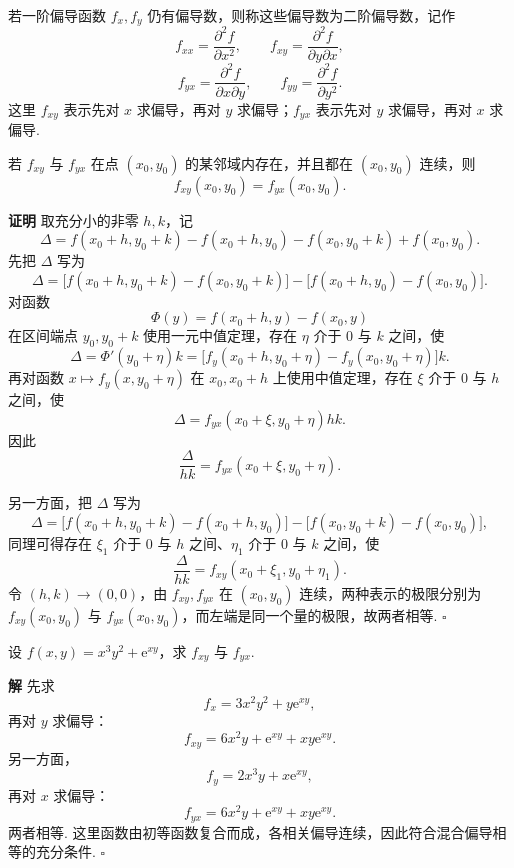 \documentclass[fontset=fandol]{ctexart}
\newenvironment{proofdetail}{\par\noindent\textbf{证明}\quad}{\hfill$\square$\par\vspace{0.8em}}
\newenvironment{solution}{\par\noindent\textbf{解}\quad}{\hfill$\square$\par\vspace{0.8em}}
\newcommand{\ee}{\mathrm{e}}
\begin{document}
\begin{definition}[二阶偏导数]
若一阶偏导函数 $f_x,f_y$ 仍有偏导数，则称这些偏导数为二阶偏导数，记作
\[
f_{xx}=\frac{\partial^2 f}{\partial x^2},\qquad
f_{xy}=\frac{\partial^2 f}{\partial y\partial x},
\]
\[
f_{yx}=\frac{\partial^2 f}{\partial x\partial y},\qquad
f_{yy}=\frac{\partial^2 f}{\partial y^2}.
\]
这里 $f_{xy}$ 表示先对 $x$ 求偏导，再对 $y$ 求偏导；$f_{yx}$ 表示先对 $y$ 求偏导，再对 $x$ 求偏导.
\end{definition}

\begin{theorem}[混合偏导相等的充分条件]
若 $f_{xy}$ 与 $f_{yx}$ 在点 $(x_0,y_0)$ 的某邻域内存在，并且都在 $(x_0,y_0)$ 连续，则
\[
f_{xy}(x_0,y_0)=f_{yx}(x_0,y_0).
\]
\end{theorem}
\begin{proofdetail}
取充分小的非零 $h,k$，记
\[
\Delta=f(x_0+h,y_0+k)-f(x_0+h,y_0)-f(x_0,y_0+k)+f(x_0,y_0).
\]
先把 $\Delta$ 写为
\[
\Delta=\bigl[f(x_0+h,y_0+k)-f(x_0,y_0+k)\bigr]
-\bigl[f(x_0+h,y_0)-f(x_0,y_0)\bigr].
\]
对函数
\[
\Phi(y)=f(x_0+h,y)-f(x_0,y)
\]
在区间端点 $y_0,y_0+k$ 使用一元中值定理，存在 $\eta$ 介于 $0$ 与 $k$ 之间，使
\[
\Delta=\Phi'(y_0+\eta)k
=\bigl[f_y(x_0+h,y_0+\eta)-f_y(x_0,y_0+\eta)\bigr]k.
\]
再对函数 $x\mapsto f_y(x,y_0+\eta)$ 在 $x_0,x_0+h$ 上使用中值定理，存在 $\xi$ 介于 $0$ 与 $h$ 之间，使
\[
\Delta=f_{yx}(x_0+\xi,y_0+\eta)hk.
\]
因此
\[
\frac{\Delta}{hk}=f_{yx}(x_0+\xi,y_0+\eta).
\]

另一方面，把 $\Delta$ 写为
\[
\Delta=\bigl[f(x_0+h,y_0+k)-f(x_0+h,y_0)\bigr]
-\bigl[f(x_0,y_0+k)-f(x_0,y_0)\bigr],
\]
同理可得存在 $\xi_1$ 介于 $0$ 与 $h$ 之间、$\eta_1$ 介于 $0$ 与 $k$ 之间，使
\[
\frac{\Delta}{hk}=f_{xy}(x_0+\xi_1,y_0+\eta_1).
\]
令 $(h,k)\to(0,0)$，由 $f_{xy},f_{yx}$ 在 $(x_0,y_0)$ 连续，两种表示的极限分别为 $f_{xy}(x_0,y_0)$ 与 $f_{yx}(x_0,y_0)$，而左端是同一个量的极限，故两者相等.
\end{proofdetail}

\begin{example}[二阶偏导]
设 $f(x,y)=x^3y^2+\ee^{xy}$，求 $f_{xy}$ 与 $f_{yx}$.
\end{example}
\begin{solution}
先求
\[
f_x=3x^2y^2+y\ee^{xy},
\]
再对 $y$ 求偏导：
\[
f_{xy}=6x^2y+\ee^{xy}+xy\ee^{xy}.
\]
另一方面，
\[
f_y=2x^3y+x\ee^{xy},
\]
再对 $x$ 求偏导：
\[
f_{yx}=6x^2y+\ee^{xy}+xy\ee^{xy}.
\]
两者相等. 这里函数由初等函数复合而成，各相关偏导连续，因此符合混合偏导相等的充分条件.
\end{solution}
\end{document}
